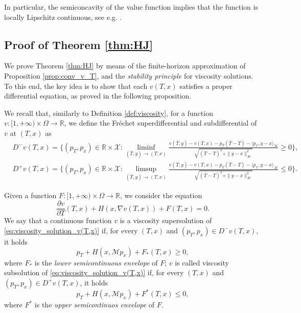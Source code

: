 \documentclass[a4paper,10pt]{amsart}
\newcommand{\numberset}{\mathbb}
\newcommand{\R}{\numberset{R}}
\theoremstyle{plain}
\theoremstyle{definition}
\numberwithin{equation}{section}
\numberwithin{thm}{section}
\begin{document}
In particular, the semiconcavity of the value function implies that the function is locally Lipschitz continuous, see e.g. \cite{MR2041617}.



\subsection{Proof of Theorem \ref{thm:HJ}}\label{sec:proofHJ} 



We prove Theorem \ref{thm:HJ} by means of the finite-horizon approximation of Proposition \ref{prop:conv_v_T}, and the \emph{stability principle} for viscosity solutions. To this end, the key idea is to show that each $v(T,x)$ satisfies a proper differential equation, as proved in the following proposition.

We recall that, similarly to Definition \ref{def:viscosity}, for a function $v:[1,+\infty)\times\Omega\rightarrow\R$, we define the Fréchet superdifferential and subdifferential of $v$ at $(T,x)$ as
    \begin{displaymath}\begin{split}
        &D^- v(T,x) = \bigg\{ (p_T,p_x)\in \R\times\mathcal{X} : \liminf_{(\bar T,y)\rightarrow (T,x)}\frac{v(\bar T,y)-v(T,x) -p_T(\bar T-T) - \langle p_x,y-x\rangle_\mathcal{M}}{\sqrt{(\bar{T}-T)^2+\|y-x\|_\mathcal{M}^2}}\geq 0\bigg\},\\
        &D^+v(T,x) = \bigg\{  (p_T,p_x)\in \R\times\mathcal{X} : \limsup_{(\bar T,y)\rightarrow (T,x)}\frac{v(\bar T,y)-v(T,x) -p_T(\bar T-T) - \langle p_x,y-x\rangle_\mathcal{M}}{\sqrt{(\bar{T}-T)^2+\|y-x\|_\mathcal{M}^2}}\leq 0\bigg\}.
    \end{split}\end{displaymath}
    
Given a function $F:[1,+\infty)\times\Omega\rightarrow\R$, we consider the equation
\begin{equation}\label{eq:viscosity_solution_v(T,x)}
\frac{\partial v}{\partial T}(T,x) + H(x,\nabla v(T,x)) + F(T,x)=0.
\end{equation}
We say that a continuous function $v$ is a viscosity supersolution of \eqref{eq:viscosity_solution_v(T,x)} if, for every $(T,x)$ and $(p_T,p_x)\in D^-v(T,x)$, it holds
    \[
    p_T + H(x,\mathcal Mp_x) + F_*(T,x) \ge 0,
    \]
    where $F_*$ is the {\em lower semicontinuous envelope} of $F$; $v$ is called viscosity subsolution of \eqref{eq:viscosity_solution_v(T,x)} if, for every $(T,x)$ and $(p_T,p_x)\in D^+v(T,x)$, it holds
    \[
    p_T + H(x,\mathcal Mp_x) + F^*(T,x) \le 0,
    \]
    where $F^*$ is the {\em upper semicontinuos envelope} of $F$.
    
\end{document}
